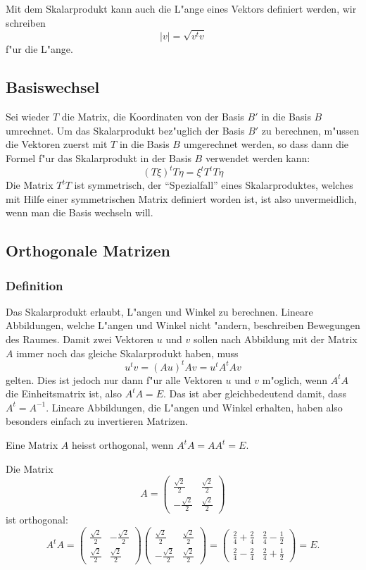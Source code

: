 Mit dem Skalarprodukt kann auch die L"ange eines Vektors definiert 
werden, wir schreiben
\[
|v|=\sqrt{v^tv}
\]
f"ur die L"ange.

\subsection{Basiswechsel}
Sei wieder $T$ die Matrix, die Koordinaten von der Basis $B'$ in die
Basis $B$ umrechnet.
Um das Skalarprodukt bez"uglich der Basis $B'$ zu berechnen,
m"ussen die Vektoren zuerst mit $T$ in die Basis $B$ umgerechnet werden,
so dass dann die Formel f"ur das Skalarprodukt in der Basis $B$
verwendet werden kann:
\[
(T\xi)^tT\eta=\xi^tT^tT\eta
\]
Die Matrix $T^tT$ ist symmetrisch, der ``Spezialfall'' eines Skalarproduktes,
welches mit Hilfe einer symmetrischen Matrix definiert worden ist,
ist also unvermeidlich, wenn man die Basis wechseln will.

\subsection{Orthogonale Matrizen}
\subsubsection{Definition}
Das Skalarprodukt erlaubt, L"angen und Winkel zu berechnen.
Lineare Abbildungen, welche L"angen und Winkel nicht "andern, beschreiben
Bewegungen des Raumes.
Damit zwei Vektoren $u$ und $v$ sollen nach Abbildung
mit der Matrix $A$ immer noch das gleiche Skalarprodukt haben, muss
\[
u^tv=(Au)^tAv=u^tA^tAv
\]
gelten.
Dies ist jedoch nur dann f"ur alle Vektoren $u$ und $v$ m"oglich,
wenn $A^tA$ die Einheitsmatrix ist, also $A^tA=E$.
Das ist aber gleichbedeutend damit, dass $A^t=A^{-1}$.
Lineare Abbildungen, die L"angen und
Winkel erhalten, haben also besonders einfach zu invertieren Matrizen.

\begin{definition}
Eine Matrix $A$ heisst orthogonal, wenn $A^tA=AA^t=E$.
\end{definition}

\begin{beispiel}
Die Matrix 
\[
A=
\begin{pmatrix}
\frac{\sqrt{2}}2& \frac{\sqrt{2}}2\\
-\frac{\sqrt{2}}2& \frac{\sqrt{2}}2
\end{pmatrix}
\]
ist orthogonal:
\[
A^tA=
\begin{pmatrix}
\frac{\sqrt{2}}2&-\frac{\sqrt{2}}2\\
\frac{\sqrt{2}}2& \frac{\sqrt{2}}2
\end{pmatrix}
\begin{pmatrix}
\frac{\sqrt{2}}2& \frac{\sqrt{2}}2\\
-\frac{\sqrt{2}}2& \frac{\sqrt{2}}2
\end{pmatrix}
=
\begin{pmatrix}
\frac24+\frac24&\frac24-\frac12\\
\frac24-\frac24&\frac24+\frac12
\end{pmatrix}
=E.
\]
\end{beispiel}

